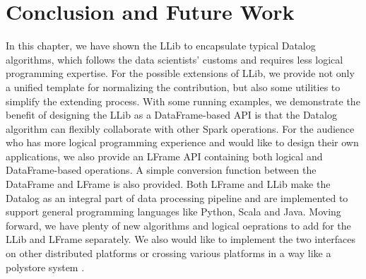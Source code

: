 \section{Conclusion and Future Work}
\label{conclusion}

In this chapter, we have shown the LLib to encapsulate typical Datalog algorithms, which follows the data scientists' customs  and requires less logical programming expertise.  For the possible  extensions of LLib, we provide not only a unified template for normalizing the contribution, but also some utilities to simplify the extending process.  With some running examples, we  demonstrate the benefit of designing the LLib as a DataFrame-based API is that the Datalog algorithm can flexibly collaborate with other Spark operations. For the audience who has more logical programming experience and would like to design their own applications, we also provide an LFrame API containing both logical and DataFrame-based operations. A simple conversion function between the DataFrame and LFrame is also provided. Both LFrame and LLib make the Datalog as an integral part of data processing pipeline and are implemented to support general programming languages like Python, Scala and Java. Moving forward, we have  plenty of new algorithms and logical oeprations to add for the LLib and LFrame separately. We also  would like to implement the two interfaces on other distributed platforms or crossing various platforms in a way like a polystore system \citep{duggan2015bigdawg}.

